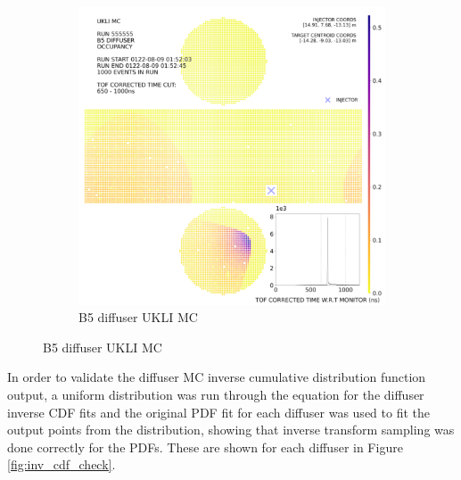 \begin{figure}[htp]
     
        
        \begin{subfigure}{0.49\columnwidth}
        \centering
        \includegraphics[width=\textwidth]{Figures/ukli_diff_mc_B5.PNG}
        \caption{B5 diffuser UKLI MC}
        
        \end{subfigure}
    
        \end{figure}
    


In order to validate the diffuser MC inverse cumulative distribution function output, a uniform distribution was run through the equation for the diffuser inverse CDF fits and the original PDF fit for each diffuser was used to fit the output points from the distribution, showing that inverse transform sampling was done correctly for the PDFs. These are shown for each diffuser in Figure \ref{fig:inv_cdf_check}. 




